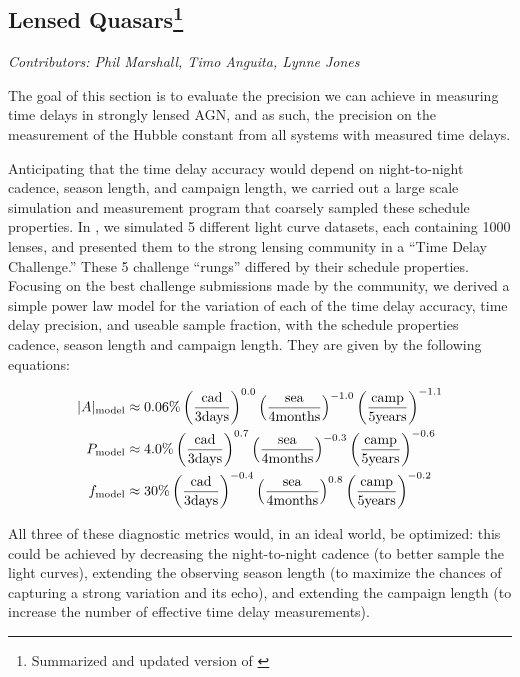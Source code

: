 \subsection{Lensed Quasars\footnote{Summarized and updated version of  \citep[Cosmology chapter of][]{LSSTScienceCollaboration2017}}}
\textit{Contributors: Phil Marshall, Timo Anguita, Lynne Jones}


The goal of this section is to evaluate the precision we can achieve in measuring time delays in strongly lensed AGN, and as such, the precision on the measurement of the Hubble constant from all systems with measured time delays.

Anticipating that the time delay accuracy would depend on night-to-night
cadence, season length, and campaign length, we carried out a large
scale simulation and measurement program that coarsely sampled these
schedule properties. In \cite{Liao2015}, we simulated 5 different
light curve datasets, each containing 1000 lenses, and presented them to
the strong lensing community in a ``Time Delay Challenge.'' These 5
challenge ``rungs'' differed by their schedule properties. Focusing on the best challenge
submissions made by the community, we derived a simple power law model
for the variation of each of the time delay accuracy, time delay
precision, and useable sample fraction, with the schedule properties
cadence, season length and campaign length. They are
given by the following equations:

\begin{align}
|A|_{\rm model} &\approx 0.06\% \left(\frac{\rm cad} {\rm 3 days}  \right)^{0.0}
\left(\frac{\rm sea}  {\rm 4 months}\right)^{-1.0}
\left(\frac{\rm camp}{\rm 5 years} \right)^{-1.1}  \notag \\
P_{\rm model} &\approx 4.0\% \left(\frac{\rm cad} {\rm 3 days}  \right)^{ 0.7}
\left(\frac{\rm sea}  {\rm 4 months}\right)^{-0.3}
\left(\frac{\rm camp}{\rm 5 years} \right)^{-0.6}  \notag \\
f_{\rm model} &\approx 30\% \left(\frac{\rm cad} {\rm 3 days}  \right)^{-0.4}
\left(\frac{\rm sea}  {\rm 4 months}\right)^{ 0.8}
\left(\frac{\rm camp}{\rm 5 years} \right)^{-0.2} \notag 
\end{align}

All three of these diagnostic metrics would, in an ideal world, be
optimized: this could be achieved by decreasing the night-to-night
cadence (to better sample the light curves), extending the observing
season length (to maximize the chances of capturing a strong variation
and its echo), and extending the campaign length (to increase the number
of effective time delay measurements).

